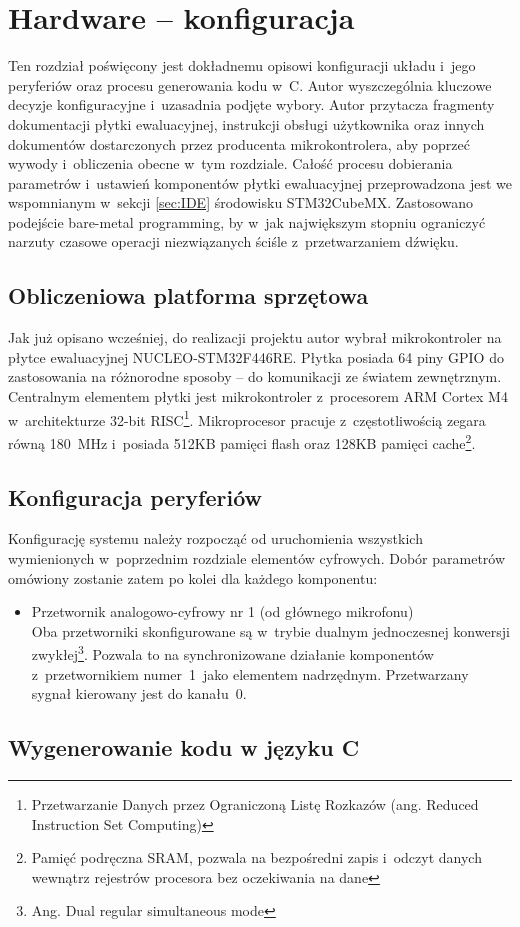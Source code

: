 \chapter{Hardware -- konfiguracja}
Ten rozdział poświęcony jest dokładnemu opisowi konfiguracji układu i~jego peryferiów oraz procesu generowania kodu w~C. Autor wyszczególnia kluczowe decyzje konfiguracyjne i~uzasadnia podjęte wybory. Autor przytacza fragmenty dokumentacji płytki ewaluacyjnej, instrukcji obsługi użytkownika oraz innych dokumentów dostarczonych przez producenta mikrokontrolera, aby poprzeć wywody i~obliczenia obecne w~tym rozdziale. Całość procesu dobierania parametrów i~ustawień komponentów płytki ewaluacyjnej przeprowadzona jest we wspomnianym w~sekcji \ref{sec:IDE} środowisku STM32CubeMX. Zastosowano podejście bare-metal programming, by w~jak największym stopniu ograniczyć narzuty czasowe operacji niezwiązanych ściśle z~przetwarzaniem dźwięku.
\section{Obliczeniowa platforma sprzętowa}
Jak już opisano wcześniej, do realizacji projektu autor wybrał mikrokontroler na płytce ewaluacyjnej NUCLEO-STM32F446RE. Płytka posiada 64 piny GPIO do zastosowania na różnorodne sposoby -- do komunikacji ze światem zewnętrznym. Centralnym elementem płytki jest mikrokontroler z~procesorem ARM Cortex M4 w~architekturze 32-bit RISC\footnote{Przetwarzanie Danych przez Ograniczoną Listę Rozkazów (ang. Reduced Instruction Set Computing)}. Mikroprocesor pracuje z~częstotliwością zegara równą \SI{180}{\MHz} i~posiada 512KB pamięci flash oraz 128KB pamięci cache\footnote{Pamięć podręczna SRAM, pozwala na bezpośredni zapis i~odczyt danych wewnątrz rejestrów procesora bez oczekiwania na dane}.
\section{Konfiguracja peryferiów}
Konfigurację systemu należy rozpocząć od uruchomienia wszystkich wymienionych w~poprzednim rozdziale elementów cyfrowych. Dobór parametrów omówiony zostanie zatem po kolei dla każdego komponentu:
\begin{itemize}
	\item Przetwornik analogowo-cyfrowy nr 1 (od głównego mikrofonu)\\
	Oba przetworniki skonfigurowane są w~trybie dualnym jednoczesnej konwersji zwykłej\footnote{Ang. Dual regular simultaneous mode}. Pozwala to na synchronizowane działanie komponentów z~przetwornikiem numer~1~jako elementem nadrzędnym. Przetwarzany sygnał kierowany jest do kanału~0. 
\end{itemize}
\section{Wygenerowanie kodu w języku C}
\label{sec:configGenerate}